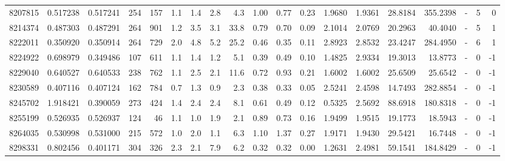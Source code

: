 \begin{tabular}{rrrrrrrrrrrrrrrrlrr}
   8207815 & 0.517238 &   0.517241 &  254 &  157 &      1.1 &      1.4 &     2.8 &      4.3 &       1.00 &        0.77 &        0.23 &  1.9680 &  1.9361 &   28.8184 &  355.2398 &             - &        5 &          0 \\
   8214374 & 0.487303 &   0.487291 &  264 &  901 &      1.2 &      3.5 &     3.1 &     33.8 &       0.79 &        0.70 &        0.09 &  2.1014 &  2.0769 &   20.2963 &   40.4040 &             - &        5 &          1 \\
   8222011 & 0.350920 &   0.350914 &  264 &  729 &      2.0 &      4.8 &     5.2 &     25.2 &       0.46 &        0.35 &        0.11 &  2.8923 &  2.8532 &   23.4247 &  284.4950 &             - &        6 &          1 \\
   8224922 & 0.698979 &   0.349486 &  107 &  611 &      1.1 &      1.4 &     1.2 &      5.1 &       0.39 &        0.49 &        0.10 &  1.4825 &  2.9334 &   19.3013 &   13.8773 &             - &        0 &         -1 \\
   8229040 & 0.640527 &   0.640533 &  238 &  762 &      1.1 &      2.5 &     2.1 &     11.6 &       0.72 &        0.93 &        0.21 &  1.6002 &  1.6002 &   25.6509 &   25.6542 &             - &        0 &         -1 \\
   8230589 & 0.407116 &   0.407124 &  162 &  784 &      0.7 &      1.3 &     0.9 &      2.3 &       0.38 &        0.33 &        0.05 &  2.5241 &  2.4598 &   14.7493 &  282.8854 &             - &        0 &         -1 \\
   8245702 & 1.918421 &   0.390059 &  273 &  424 &      1.4 &      2.4 &     2.4 &      8.1 &       0.61 &        0.49 &        0.12 &  0.5325 &  2.5692 &   88.6918 &  180.8318 &             - &        0 &         -1 \\
   8255199 & 0.526935 &   0.526937 &  124 &   46 &      1.1 &      1.0 &     1.9 &      2.1 &       0.89 &        0.73 &        0.16 &  1.9499 &  1.9515 &   19.1773 &   18.5943 &             - &        0 &         -1 \\
   8264035 & 0.530998 &   0.531000 &  215 &  572 &      1.0 &      2.0 &     1.1 &      6.3 &       1.10 &        1.37 &        0.27 &  1.9171 &  1.9430 &   29.5421 &   16.7448 &             - &        0 &         -1 \\
   8298331 & 0.802456 &   0.401171 &  304 &  326 &      2.3 &      2.1 &     7.9 &      6.2 &       0.32 &        0.32 &        0.00 &  1.2631 &  2.4981 &   59.1541 &  184.8429 &             - &        0 &         -1 \\

\end{tabular}
